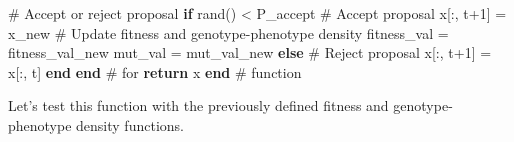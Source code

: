 \documentclass[
]{scrartcl}
\newenvironment{Shaded}{\begin{snugshade}}{\end{snugshade}}
\newcommand{\CommentTok}[1]{\textcolor[rgb]{0.37,0.37,0.37}{#1}}
\newcommand{\ControlFlowTok}[1]{\textcolor[rgb]{0.00,0.23,0.31}{\textbf{#1}}}
\newcommand{\FloatTok}[1]{\textcolor[rgb]{0.68,0.00,0.00}{#1}}
\newcommand{\FunctionTok}[1]{\textcolor[rgb]{0.28,0.35,0.67}{#1}}
\newcommand{\KeywordTok}[1]{\textcolor[rgb]{0.00,0.23,0.31}{\textbf{#1}}}
\newcommand{\NormalTok}[1]{\textcolor[rgb]{0.00,0.23,0.31}{#1}}
\newcommand{\OperatorTok}[1]{\textcolor[rgb]{0.37,0.37,0.37}{#1}}
\begin{document}
\begin{Shaded}
\begin{Highlighting}[]
        \CommentTok{\# Accept or reject proposal}
        \ControlFlowTok{if} \FunctionTok{rand}\NormalTok{() }\OperatorTok{\textless{}}\NormalTok{ P\_accept}
            \CommentTok{\# Accept proposal}
\NormalTok{            x[}\OperatorTok{:}\NormalTok{, t}\OperatorTok{+}\FloatTok{1}\NormalTok{] }\OperatorTok{=}\NormalTok{ x\_new}
            \CommentTok{\# Update fitness and genotype{-}phenotype density}
\NormalTok{            fitness\_val }\OperatorTok{=}\NormalTok{ fitness\_val\_new}
\NormalTok{            mut\_val }\OperatorTok{=}\NormalTok{ mut\_val\_new}
        \ControlFlowTok{else}
            \CommentTok{\# Reject proposal}
\NormalTok{            x[}\OperatorTok{:}\NormalTok{, t}\OperatorTok{+}\FloatTok{1}\NormalTok{] }\OperatorTok{=}\NormalTok{ x[}\OperatorTok{:}\NormalTok{, t]}
        \ControlFlowTok{end}
    \ControlFlowTok{end} \CommentTok{\# for}
    \ControlFlowTok{return}\NormalTok{ x}
\KeywordTok{end} \CommentTok{\# function}
\end{Highlighting}
\end{Shaded}

Let's test this function with the previously defined fitness and
genotype-phenotype density functions.
\end{document}
